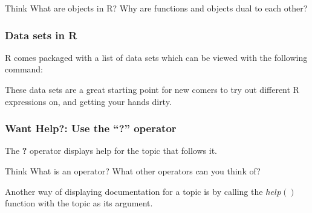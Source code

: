 \begin{HIGHLIGHT}
\par{}
\end{HIGHLIGHT}

\begin{DIY}{Think}
What are objects in R? Why are functions and objects dual to each other? 
\end{DIY}

\subsubsection{Data sets in R}
\noindent R comes packaged with a list of data sets which can be viewed with the following command: 
\begin{knitrout}
\color{fgcolor}\begin{kframe}
\begin{alltt}
\hlstd{(} \hlstd{=} \hlstd{)}
\end{alltt}
\end{kframe}
\end{knitrout}
\noindent These data sets are a great starting point for new comers to try out different R expressions on, and getting your hands dirty. 
\subsubsection{Want Help?: Use the ``\textbf{?}'' operator}
\noindent The \textbf{?} operator displays help for the topic that follows it.
\begin{knitrout}
\color{fgcolor}\begin{kframe}
\begin{alltt}
\end{alltt}
\end{kframe}
\end{knitrout}

\begin{DIY}{Think}
What is an operator? What other operators can you think of? 
\end{DIY}

\noindent Another way of displaying documentation for a topic is by calling the $help()$ function with the topic as its argument. 
\begin{knitrout}
\color{fgcolor}\begin{kframe}
\begin{alltt}
\hlstd{(}\hlstd{)}
\end{alltt}
\end{kframe}
\end{knitrout}
